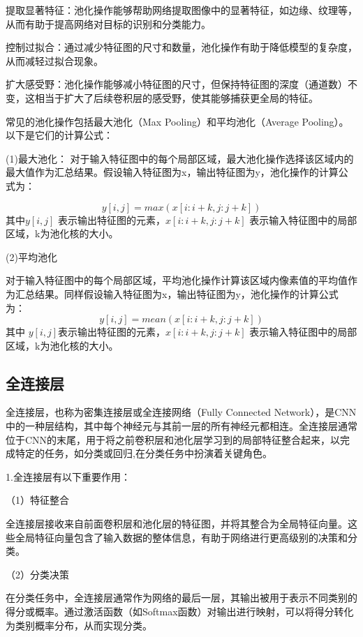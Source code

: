 提取显著特征：池化操作能够帮助网络提取图像中的显著特征，如边缘、纹理等，从而有助于提高网络对目标的识别和分类能力。

控制过拟合：通过减少特征图的尺寸和数量，池化操作有助于降低模型的复杂度，从而减轻过拟合现象。

扩大感受野：池化操作能够减小特征图的尺寸，但保持特征图的深度（通道数）不变，这相当于扩大了后续卷积层的感受野，使其能够捕获更全局的特征。


常见的池化操作包括最大池化（Max Pooling）和平均池化（Average Pooling）。以下是它们的计算公式：

(1)最大池化：
对于输入特征图中的每个局部区域，最大池化操作选择该区域内的最大值作为汇总结果。假设输入特征图为x，输出特征图为y，池化操作的计算公式为：

\begin{equation}
	y[i, j] = max(x[i:i+k, j:j+k])
\end{equation}
 其中$ y[i, j]$ 表示输出特征图的元素，$x[i:i+k, j:j+k]$ 表示输入特征图中的局部区域，k为池化核的大小。


(2)平均池化

对于输入特征图中的每个局部区域，平均池化操作计算该区域内像素值的平均值作为汇总结果。同样假设输入特征图为x，输出特征图为y，池化操作的计算公式为：
\begin{equation}
	y[i, j] = mean(x[i:i+k, j:j+k])
\end{equation}
其中 $y[i, j] $表示输出特征图的元素，$x[i:i+k, j:j+k]$ 表示输入特征图中的局部区域，k为池化核的大小。


\subsection{全连接层}

全连接层，也称为密集连接层或全连接网络（Fully Connected Network），是CNN中的一种层结构，其中每个神经元与其前一层的所有神经元都相连。全连接层通常位于CNN的末尾，用于将之前卷积层和池化层学习到的局部特征整合起来，以完成特定的任务，如分类或回归,在分类任务中扮演着关键角色。

1.全连接层有以下重要作用：

（1）特征整合

全连接层接收来自前面卷积层和池化层的特征图，并将其整合为全局特征向量。这些全局特征向量包含了输入数据的整体信息，有助于网络进行更高级别的决策和分类。

（2）分类决策

在分类任务中，全连接层通常作为网络的最后一层，其输出被用于表示不同类别的得分或概率。通过激活函数（如Softmax函数）对输出进行映射，可以将得分转化为类别概率分布，从而实现分类。

